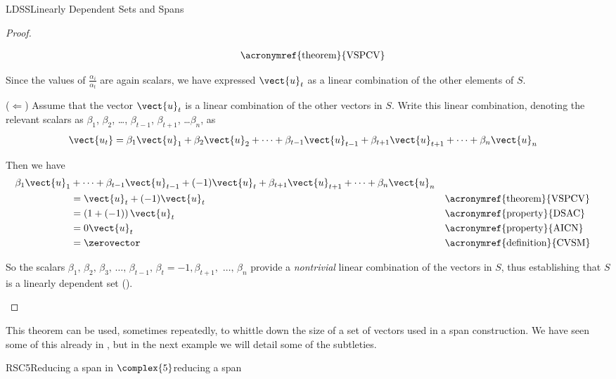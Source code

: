 \begin{subsect}{LDSS}{Linearly Dependent Sets and Spans}
\begin{proof}
\begin{para}
\begin{align*}
&&\text{\acronymref{theorem}{VSPCV}}
\end{align*}
\end{para}
%
\begin{para}Since the values of $\frac{\alpha_i}{\alpha_t}$ are again scalars, we have expressed $\vect{u}_t$ as a linear combination of the other elements of $S$.\end{para}
%
\begin{para}($\Leftarrow$) Assume that the vector $\vect{u}_t$ is a linear combination of the other vectors in $S$.  Write this linear combination,  denoting the relevant scalars as $\beta_1$, $\beta_2$, \dots, $\beta_{t-1}$, $\beta_{t+1}$, \dots $\beta_n$, as
%
\begin{align*}
\vect{u_t}
&=
\beta_1\vect{u}_1+
\beta_2\vect{u}_2+
\cdots+
\beta_{t-1}\vect{u}_{t-1}+
\beta_{t+1}\vect{u}_{t+1}+
\cdots+
\beta_n\vect{u}_n
\end{align*}
\end{para}
%
\begin{para}Then we have
%
\begin{align*}
\beta_1\vect{u}_1
&+\cdots+
\beta_{t-1}\vect{u}_{t-1}+
(-1)\vect{u}_t+
\beta_{t+1}\vect{u}_{t+1}+
\cdots+
\beta_n\vect{u}_n\\
&=\vect{u}_t+(-1)\vect{u}_t&&\text{\acronymref{theorem}{VSPCV}}\\
&=\left(1+\left(-1\right)\right)\vect{u}_t&&\text{\acronymref{property}{DSAC}}\\
&=0\vect{u}_t&&\text{\acronymref{property}{AICN}}\\
&=\zerovector&&\text{\acronymref{definition}{CVSM}}
\end{align*}
\end{para}
%
\begin{para}So the scalars $\beta_1,\,\beta_2,\,\beta_3,\,\ldots,\,\beta_{t-1},\,\beta_t=-1,\beta_{t+1},\,\,\ldots,\,\beta_n$ provide a {\em nontrivial} linear combination of the vectors in $S$, thus establishing that $S$ is a linearly dependent set ().
\end{para}
\end{proof}
%
\begin{para}This theorem can be used, sometimes repeatedly, to whittle down the size of a set of vectors used in a span construction.  We have seen some of this already in , but in the next example we will detail some of the subtleties.\end{para}
%
\begin{example}{RSC5}{Reducing a span in $\complex{5}$}{reducing a span}

\end{example}
\end{subsect}
